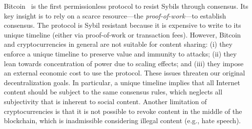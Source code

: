 \documentclass[12pt]{article}
\begin{document}
Bitcoin~\cite{p2p.bitcoin} is the first permissionless protocol to resist
Sybils through consensus.
Its key insight is to rely on a scarce resource---the \emph{proof-of-work}---to
establish consensus.
The protocol is Sybil resistant because it is expensive to write to its
unique timeline (either via proof-of-work or transaction fees).
%
However, Bitcoin and cryptocurrencies in general are not suitable for content
sharing:
    (i)   they enforce a unique timeline to preserve value and immunity to
          attacks;
    (ii)  they lean towards concentration of power due to scaling effects; and
    (iii) they impose an external economic cost to use the protocol.
These issues threaten our original decentralization goals.
In particular, a unique timeline implies that all Internet content should be
subject to the same consensus rules, which neglects all subjectivity that is
inherent to social content.
Another limitation of cryptocurrencies is that it is not possible to revoke
content in the middle of the blockchain, which is inadmissible considering
illegal content (e.g., hate speech).
\end{document}
